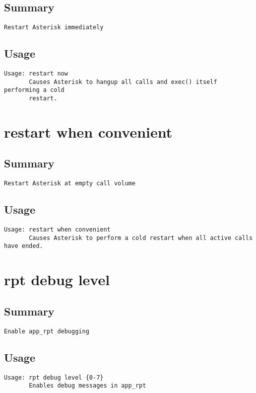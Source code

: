 \subsection{Summary}
\begin{verbatim}
Restart Asterisk immediately
\end{verbatim}
\subsection{Usage}
\begin{verbatim}
Usage: restart now
       Causes Asterisk to hangup all calls and exec() itself performing a cold
       restart.

\end{verbatim}


\section{restart when convenient}
\subsection{Summary}
\begin{verbatim}
Restart Asterisk at empty call volume
\end{verbatim}
\subsection{Usage}
\begin{verbatim}
Usage: restart when convenient
       Causes Asterisk to perform a cold restart when all active calls have ended.

\end{verbatim}


\section{rpt debug level}
\subsection{Summary}
\begin{verbatim}
Enable app_rpt debugging
\end{verbatim}
\subsection{Usage}
\begin{verbatim}
Usage: rpt debug level {0-7}
       Enables debug messages in app_rpt

\end{verbatim}


